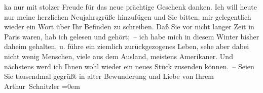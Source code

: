 \begin{ledgroupsized}[t]{13cm}
                    ka{\geminationn} nur mit stolzer Freude für das neue prächtige Geschenk danken. Ich will
                    heute nur meine herzlichen Neujahrsgrüße hinzufügen und Sie bitten, mir
                    gelegentlich wieder ein Wort über Ihr Befinden zu schreiben. Daß Sie vor nicht
                    langer Zeit in Paris waren, hab ich gelesen und
                    gehört; – ich habe mich in diesem Winter bisher daheim gehalten, u. {\pb}führe ein ziemlich zurückgezogenes Leben,
                    sehe aber dabei nicht wenig Menschen, viele aus dem Ausland, meistens Amerikaner. Und nächstens werd ich Ihnen wohl
                    wieder ein neues Stück zusenden können. –\pend
           \pstart
           Seien Sie tausendmal gegrüßt in alter Bewunderung und Liebe von Ihrem{\\[\baselineskip]}\spacefill\mbox{Arthur Schnitzler}\pend
           \leftskip=0em{}          \endnumbering{}\end{ledgroupsized}  \newcommand{\dateiname}{L02407}\newcommand{\titel}{Arthur Schnitzler an Georg Brandes, 4. 1. 1924}\newcommand{\editorInnen}{Martin Anton Müller und Gerd-Hermann Susen}
            \footnotesize
\begin{ledgroupsized}[t]{11.5cm}
\end{ledgroupsized}
         
      